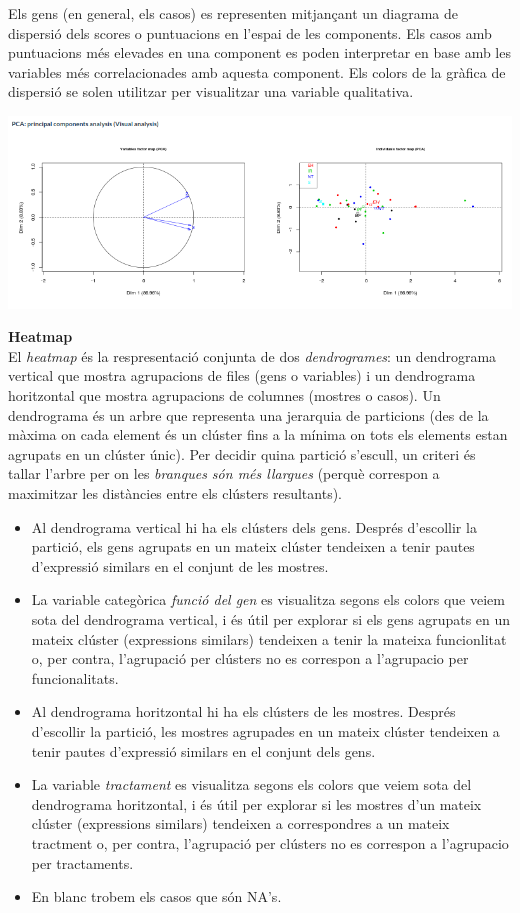 \documentclass[english]{article}
\begin{document}
\noindent Els gens (en general, els casos) es representen mitjançant un diagrama de dispersió dels scores o puntuacions en l'espai de les components. Els casos amb puntuacions més elevades en una component es poden interpretar en base amb les variables més correlacionades amb aquesta component. Els colors de la gràfica de dispersió se solen utilitzar per visualitzar una variable qualitativa.
\begin{center}
\includegraphics[scale=0.3]{app5.png}
\end{center}

\noindent\textbf{Heatmap}\\

\noindent El \textit{heatmap} és la respresentació conjunta de dos \textit{dendrogrames}: un dendrograma vertical que mostra agrupacions de files (gens o variables) i un dendrograma horitzontal que mostra agrupacions de columnes (mostres o casos). Un dendrograma és un arbre que representa una jerarquia de particions (des de la màxima on cada element és un clúster fins a la mínima on tots els elements estan agrupats en un clúster únic). Per decidir quina partició s'escull, un criteri és tallar l'arbre per on les \textit{branques són més llargues} (perquè correspon a maximitzar les distàncies entre els clústers resultants).
\begin{itemize}
\item Al dendrograma vertical hi ha els clústers dels gens. Després d'escollir la partició, els gens agrupats en un mateix clúster tendeixen a tenir pautes d'expressió similars en el conjunt de les mostres.
\item  La variable categòrica \textit{funció del gen} es visualitza segons els colors que veiem sota del dendrograma vertical, i és  útil per explorar si els gens agrupats en un mateix clúster (expressions similars) tendeixen a tenir la mateixa funcionlitat o, per contra, l'agrupació per clústers no es correspon a l'agrupacio per funcionalitats.
\item  Al dendrograma horitzontal hi ha els clústers de les mostres. Després d'escollir la partició, les mostres agrupades en un mateix clúster tendeixen a tenir pautes d'expressió similars en el conjunt dels gens.
\item  La variable \textit{tractament} es visualitza segons els colors que veiem sota del dendrograma horitzontal, i és útil per  explorar si les mostres d'un mateix clúster (expressions similars) tendeixen a correspondres a un mateix tractment o, per contra, l'agrupació per clústers no es correspon a l'agrupacio per tractaments.
\item  En blanc trobem els casos que són NA's.
\end{itemize}
\end{document}
